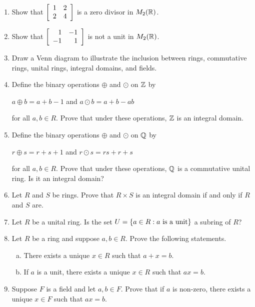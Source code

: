 \documentclass[11pt,fleqn,dvipsnames,usenames]{article}
\begin{document}
\begin{enumerate}[1.]
\item Show that $\MATRIX{rr}{1 & 2\\2 & 4}$ is a zero divisor in $M_{2}(\REAL)$.

\item Show that $\MATRIX{rr}{1 & -1\\-1 & 1}$ is not a unit in $M_{2}(\REAL)$.

\item Draw a Venn diagram to illustrate the inclusion between rings, commutative rings, unital rings, integral domains, and fields.

\item Define the binary operations $\oplus$ and $\odot$ on $\Z$ by
\begin{center}
$a\oplus b = a + b - 1$ and $a\odot b = a + b - ab$
\end{center}
for all $a,b\in R$.  Prove that under these operations, $\Z$ is an integral domain.

\item Define the binary operations $\oplus$ and $\odot$ on $\Q$ by
\begin{center}
$r\oplus s = r + s + 1$ and $r\odot s = rs + r + s$
\end{center}
for all $a,b\in R$.  Prove that under these operations, $\Q$ is a commutative unital ring.  Is it an integral domain?

\item Let $R$ and $S$ be rings.  Prove that $R\times S$ is an integral domain if and only if $R$ and $S$ are.

\item Let $R$ be a unital ring.  Is the set $U = \SET{a\in R:a\text{ is a unit}}$ a subring of $R$?

\item Let $R$ be a ring and suppose $a,b\in R$.  Prove the following statements.
\begin{enumerate}[(a)]
\item There exists a unique $x\in R$ such that $a + x = b$.
\item If $a$ is a unit, there exists a unique $x\in R$ such that $ax=b$.   
\end{enumerate}

\item Suppose $F$ is a field and let $a,b\in F$.  Prove that if $a$ is non-zero, there exists a unique $x\in F$ such that $ax = b$.

\end{enumerate}
\end{document}
